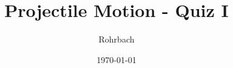 \documentclass[10pt]{exam}
\title{Projectile Motion - Quiz I}
\author{Rohrbach}
\date{\today}
\begin{document}
\maketitle

\def\vo{1.1}
\def\yo{4.2}

\end{document}
